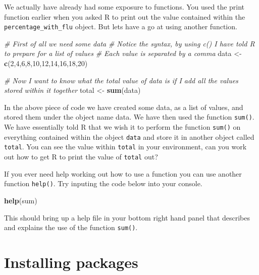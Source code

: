 \documentclass[
]{book}
\newenvironment{Shaded}{\begin{snugshade}}{\end{snugshade}}
\newcommand{\CommentTok}[1]{\textcolor[rgb]{0.56,0.35,0.01}{\textit{#1}}}
\newcommand{\DecValTok}[1]{\textcolor[rgb]{0.00,0.00,0.81}{#1}}
\newcommand{\FunctionTok}[1]{\textcolor[rgb]{0.13,0.29,0.53}{\textbf{#1}}}
\newcommand{\NormalTok}[1]{#1}
\newcommand{\OtherTok}[1]{\textcolor[rgb]{0.56,0.35,0.01}{#1}}
\begin{document}
We actually have already had some exposure to functions. You used the print function earlier when you asked R to print out the value contained within the \texttt{percentage\_with\_flu} object. But lets have a go at using another function.

\begin{Shaded}
\begin{Highlighting}[]
\CommentTok{\# First of all we need some data}
\CommentTok{\# Notice the syntax, by using c() I have told R to prepare for a list of values}
\CommentTok{\# Each value is separated by a comma}
\NormalTok{data }\OtherTok{\textless{}{-}} \FunctionTok{c}\NormalTok{(}\DecValTok{2}\NormalTok{,}\DecValTok{4}\NormalTok{,}\DecValTok{6}\NormalTok{,}\DecValTok{8}\NormalTok{,}\DecValTok{10}\NormalTok{,}\DecValTok{12}\NormalTok{,}\DecValTok{14}\NormalTok{,}\DecValTok{16}\NormalTok{,}\DecValTok{18}\NormalTok{,}\DecValTok{20}\NormalTok{)}

\CommentTok{\# Now I want to know what the total value of data is if I add all the values stored within it together}
\NormalTok{total }\OtherTok{\textless{}{-}} \FunctionTok{sum}\NormalTok{(data)}
\end{Highlighting}
\end{Shaded}

In the above piece of code we have created some data, as a list of values, and stored them under the object name data. We have then used the function \texttt{sum()}. We have essentially told R that we wish it to perform the function \texttt{sum()} on everything contained within the object \texttt{data} and store it in another object called \texttt{total}. You can see the value within \texttt{total} in your environment, can you work out how to get R to print the value of \texttt{total} out?

If you ever need help working out how to use a function you can use another function \texttt{help()}. Try inputing the code below into your console.

\begin{Shaded}
\begin{Highlighting}[]
\FunctionTok{help}\NormalTok{(sum)}
\end{Highlighting}
\end{Shaded}

This should bring up a help file in your bottom right hand panel that describes and explains the use of the function \texttt{sum()}.

\section{Installing packages}\label{installing-packages}
\end{document}
